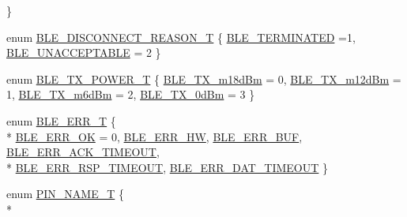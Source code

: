 \begin{DoxyCompactItemize}
 \}
\item 
enum \hyperlink{group___enumerations_gafdc7d73c1364c4d42f80cfdc702de294}{B\-L\-E\-\_\-\-D\-I\-S\-C\-O\-N\-N\-E\-C\-T\-\_\-\-R\-E\-A\-S\-O\-N\-\_\-\-T} \{ \hyperlink{group___enumerations_ggafdc7d73c1364c4d42f80cfdc702de294a3aaba90cbef710f140a4f7e70d1f0d5b}{B\-L\-E\-\_\-\-T\-E\-R\-M\-I\-N\-A\-T\-E\-D} =1, 
\hyperlink{group___enumerations_ggafdc7d73c1364c4d42f80cfdc702de294a0951f45ff7c03c7b46d1f96332c8fc27}{B\-L\-E\-\_\-\-U\-N\-A\-C\-C\-E\-P\-T\-A\-B\-L\-E} = 2
 \}
\item 
enum \hyperlink{group___enumerations_ga3b6d6db9e13e93ae21f2a383d9903617}{B\-L\-E\-\_\-\-T\-X\-\_\-\-P\-O\-W\-E\-R\-\_\-\-T} \{ \hyperlink{group___enumerations_gga3b6d6db9e13e93ae21f2a383d9903617a5c98a88cfa9a664b8d96aa6a03ba53d9}{B\-L\-E\-\_\-\-T\-X\-\_\-m18d\-Bm} = 0, 
\hyperlink{group___enumerations_gga3b6d6db9e13e93ae21f2a383d9903617a3bb453927e41ed489d5783eb01a432b6}{B\-L\-E\-\_\-\-T\-X\-\_\-m12d\-Bm} = 1, 
\hyperlink{group___enumerations_gga3b6d6db9e13e93ae21f2a383d9903617a1db610898779c31e5fe4b7cda75c8b4e}{B\-L\-E\-\_\-\-T\-X\-\_\-m6d\-Bm} = 2, 
\hyperlink{group___enumerations_gga3b6d6db9e13e93ae21f2a383d9903617a657bee3a9a945c511d573971038ccd54}{B\-L\-E\-\_\-\-T\-X\-\_\-0d\-Bm} = 3
 \}
\item 
enum \hyperlink{group___enumerations_ga6c00522f6a8c33135ee0414877d42c04}{B\-L\-E\-\_\-\-E\-R\-R\-\_\-\-T} \{ \\*
\hyperlink{group___enumerations_gga6c00522f6a8c33135ee0414877d42c04a4b3ee10917919fa72598e8c8a0131342}{B\-L\-E\-\_\-\-E\-R\-R\-\_\-\-O\-K} = 0, 
\hyperlink{group___enumerations_gga6c00522f6a8c33135ee0414877d42c04aaa0c52ac5b1905e8035c78aeed3d1db4}{B\-L\-E\-\_\-\-E\-R\-R\-\_\-\-H\-W}, 
\hyperlink{group___enumerations_gga6c00522f6a8c33135ee0414877d42c04a54530870fb2878254b47f1e0650456ef}{B\-L\-E\-\_\-\-E\-R\-R\-\_\-\-B\-U\-F}, 
\hyperlink{group___enumerations_gga6c00522f6a8c33135ee0414877d42c04aaa3bd3b90312f5e85fc132b5d4a1a62a}{B\-L\-E\-\_\-\-E\-R\-R\-\_\-\-A\-C\-K\-\_\-\-T\-I\-M\-E\-O\-U\-T}, 
\\*
\hyperlink{group___enumerations_gga6c00522f6a8c33135ee0414877d42c04a1cf05a76d9f21338d5297bbc4bcbc355}{B\-L\-E\-\_\-\-E\-R\-R\-\_\-\-R\-S\-P\-\_\-\-T\-I\-M\-E\-O\-U\-T}, 
\hyperlink{group___enumerations_gga6c00522f6a8c33135ee0414877d42c04ac08af44027b924f6026dac945b00cbac}{B\-L\-E\-\_\-\-E\-R\-R\-\_\-\-D\-A\-T\-\_\-\-T\-I\-M\-E\-O\-U\-T}
 \}
\item 
enum \hyperlink{group___enumerations_ga65a2241721e4acb573e0c3fe29ac432f}{P\-I\-N\-\_\-\-N\-A\-M\-E\-\_\-\-T} \{ \\*

\end{DoxyCompactItemize}
